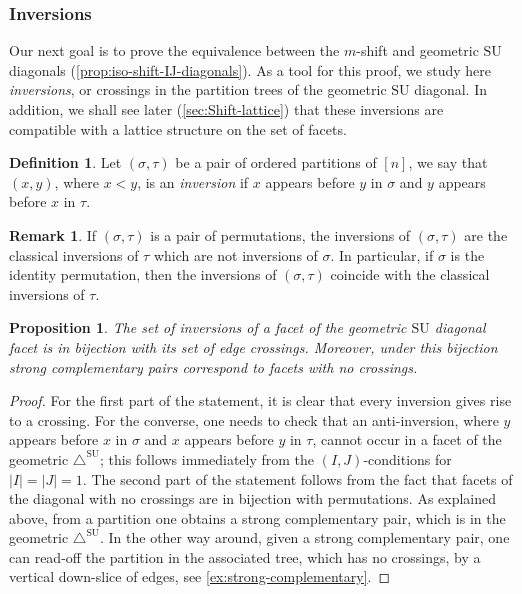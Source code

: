\documentclass{amsart}
\newcommand{\darkblue}{\color{darkblue}} %
\newcommand{\Kurt}[1]{\todo[color=orange!30]{\rm #1 \\ \hfill --- K.}}
\newtheorem{proposition}[theorem]{Proposition}
\theoremstyle{definition}
\newtheorem{definition}[theorem]{Definition}
\newtheorem{remark}[theorem]{Remark}
\newcommand{\defn}[1]{\textsl{\darkblue #1}} %
\newcommand{\SU}{\mathrm{SU}}
\newcommand{\SUD}{\triangle^{\mathrm{SU}}}
\begin{document}
\Kurt{Finished proof reading to here.}


\subsubsection{Inversions}

Our next goal is to prove the equivalence between the $m$-shift and geometric $\SU$ diagonals (\cref{prop:iso-shift-IJ-diagonals}).
As a tool for this proof, we study here \emph{inversions}, or crossings in the partition trees of the geometric $\SU$ diagonal.
In addition, we shall see later (\cref{sec:Shift-lattice}) that these inversions are compatible with a lattice structure on the set of facets. 

\begin{definition}
Let $(\sigma,\tau)$ be a pair of ordered partitions of $[n]$, we say that $(x,y)$, where $x<y$, is an \defn{inversion} if $x$ appears before $y$ in $\sigma$ and $y$ appears before $x$ in $\tau$. 
\end{definition}

\begin{remark}
	If $(\sigma,\tau)$ is a pair of permutations, the inversions of $(\sigma,\tau)$ are the classical inversions of $\tau$ which are not inversions of $\sigma$. 
	In particular, if $\sigma$ is the identity permutation, then the inversions of $(\sigma,\tau)$ coincide with the classical inversions of $\tau$. 
\end{remark}

\begin{proposition}
\label{p:crossings}
The set of inversions of a facet of the geometric $\SU$ diagonal facet is in bijection with its set of edge crossings. 
Moreover, under this bijection strong complementary pairs correspond to facets with no crossings.
\end{proposition}

\begin{proof}
For the first part of the statement, it is clear that every inversion gives rise to a crossing. 
For the converse, one needs to check that an anti-inversion, where $y$ appears before $x$ in $\sigma$ and $x$ appears before $y$ in $\tau$, cannot occur in a facet of the geometric $\SUD$; this follows immediately from the $(I,J)$-conditions for $|I|=|J|=1$. 
The second part of the statement follows from the fact that facets of the diagonal with no crossings are in bijection with permutations.
As explained above, from a partition one obtains a strong complementary pair, which is in the geometric $\SUD$. 
In the other way around, given a strong complementary pair, one can read-off the partition in the associated tree, which has no crossings, by a vertical down-slice of edges, see \cref{ex:strong-complementary}.
\end{proof}
\end{document}
